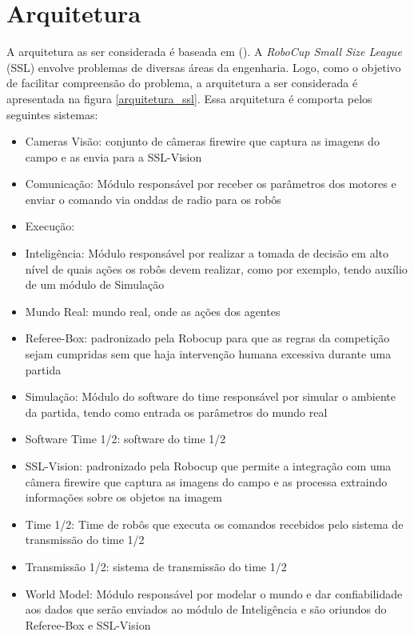\section{Arquitetura}

A arquitetura as ser considerada é baseada em (\cite{felixnavarro}).
A \textit{RoboCup Small Size League} (SSL) envolve problemas de diversas áreas
da engenharia. Logo, como o objetivo de facilitar compreensão do
problema, a arquitetura a ser considerada é apresentada na figura
\ref{arquitetura_ssl}. Essa arquitetura é comporta pelos seguintes
sistemas:

\begin{itemize}
  \item Cameras Visão: conjunto de câmeras firewire que captura as imagens do
        campo e as envia para a SSL-Vision
  \item Comunicação: Módulo responsável por receber os parâmetros
        dos motores e enviar o comando via onddas de radio para os
        robôs
  \item Execução:
  \item Inteligência: Módulo responsável por realizar a tomada de
        decisão em alto nível de quais ações os robôs devem realizar,
        como por exemplo, tendo auxílio de um módulo de Simulação
  \item Mundo Real: mundo real, onde as ações dos agentes
  \item Referee-Box:  padronizado pela Robocup para que as
        regras da competição sejam cumpridas sem que haja intervenção
        humana excessiva durante uma partida
  \item Simulação: Módulo do software do time responsável por simular
        o ambiente da partida, tendo como entrada os parâmetros do mundo
        real
  \item Software Time 1/2: software do time 1/2
  \item SSL-Vision:  padronizado pela Robocup que permite a
        integração com uma câmera firewire que captura as imagens do
        campo e as processa extraindo informações sobre os objetos na
        imagem
  \item Time 1/2: Time de robôs que executa os comandos recebidos pelo
        sistema de transmissão do time 1/2
  \item Transmissão 1/2: sistema de transmissão do time 1/2
  \item World Model: Módulo responsável por modelar o mundo e dar
        confiabilidade aos dados que serão enviados ao módulo de
        Inteligência e são oriundos do Referee-Box e SSL-Vision
\end{itemize}

